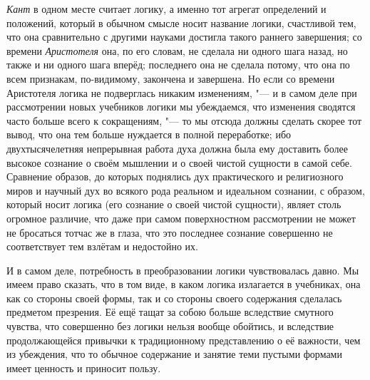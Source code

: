 {\em Кант} в одном месте
считает логику, а именно тот агрегат определений и положений, который в
обычном смысле носит название логики, счастливой тем, что она сравнительно
с другими науками достигла такого раннего завершения; со времени
{\em Аристотеля} она, по его словам, не сделала ни
одного шага назад, но также и ни одного шага вперёд; последнего она не
сделала потому, что она по всем признакам, по-видимому, закончена и
завершена. Но если со времени Аристотеля логика не подверглась никаким
изменениям, "--- и в самом деле при рассмотрении новых учебников логики мы
убеждаемся, что изменения сводятся часто больше всего к сокращениям, "--- то
мы отсюда должны сделать скорее тот вывод, что она тем больше нуждается в
полной переработке; ибо двухтысячелетняя непрерывная работа духа должна
была ему доставить более высокое сознание о своём мышлении и о своей чистой
сущности в самой себе. Сравнение образов, до которых поднялись дух
практического и религиозного миров и научный дух во всякого рода реальном и
идеальном сознании, с образом, который носит логика (его сознание о своей
чистой сущности), являет столь огромное различие, что даже при самом
поверхностном рассмотрении не может не бросаться тотчас же в глаза, что это
последнее сознание совершенно не соответствует тем взлётам и недостойно их.

И в самом деле, потребность в преобразовании логики чувствовалась давно. Мы
имеем право сказать, что в том виде, в каком логика излагается в учебниках,
она как со стороны своей формы, так и со стороны своего содержания
сделалась предметом презрения. Её ещё тащат за собою больше вследствие
смутного чувства, что совершенно без логики нельзя вообще обойтись, и
вследствие продолжающейся привычки к традиционному представлению о её
важности, чем из убеждения, что то обычное содержание и занятие теми
пустыми формами имеет ценность и приносит пользу.

